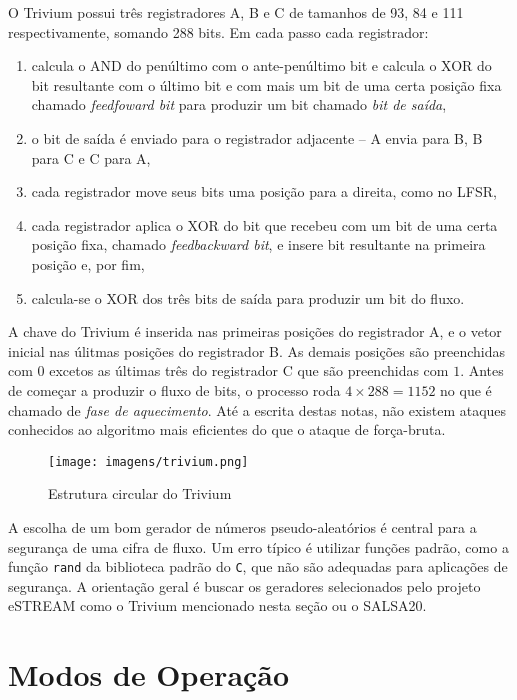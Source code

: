 O Trivium possui três registradores A, B e C de tamanhos de 93, 84 e 111 respectivamente, somando 288 bits.
Em cada passo cada registrador:
\begin{enumerate}
\item calcula o AND do penúltimo com o ante-penúltimo bit e calcula o XOR do bit resultante com o último bit e com mais um bit de uma certa posição fixa chamado {\em feedfoward bit} para produzir um bit chamado {\em bit de saída},
\item o bit de saída é enviado para o registrador adjacente -- A envia para B, B para C e C para A,
\item cada registrador move seus bits uma posição para a direita, como no LFSR,
\item cada registrador aplica o XOR do bit que recebeu com um bit de uma certa posição fixa, chamado {\em feedbackward bit}, e insere bit resultante na primeira posição e, por fim,
\item calcula-se o XOR dos três bits de saída para produzir um bit do fluxo.
\end{enumerate}

A chave do Trivium é inserida nas primeiras posições do registrador A, e o vetor inicial nas úlitmas posições do registrador B.
As demais posições são preenchidas com $0$ excetos as últimas três do registrador C que são preenchidas com $1$.
Antes de começar a produzir o fluxo de bits, o processo roda $4 \times 288 = 1152$ no que é chamado de {\em fase de aquecimento}. 
Até a escrita destas notas, não existem ataques conhecidos ao algoritmo mais eficientes do que o ataque de força-bruta.


\begin{figure}
  \centering
  \texttt{[image: imagens/trivium.png]}
  \caption{Estrutura circular do Trivium}
\end{figure}


A escolha de um bom gerador de números pseudo-aleatórios é central para a segurança de uma cifra de fluxo.
Um erro típico é utilizar funções padrão, como a função {\tt rand} da biblioteca padrão do {\tt C}, que não são adequadas para aplicações de segurança.
A orientação geral é buscar os geradores selecionados pelo projeto eSTREAM como o Trivium mencionado nesta seção ou o SALSA20.

\section{Modos de Operação}
\label{sec:modos-de-operacao}


